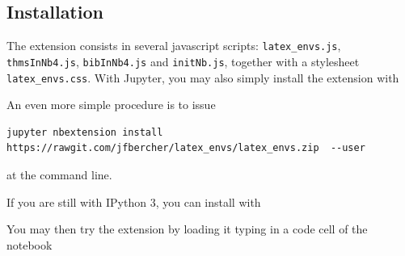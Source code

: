     \subsection{Installation}\label{installation}

    The extension consists in several javascript scripts:
\texttt{latex\_envs.js}, \texttt{thmsInNb4.js}, \texttt{bibInNb4.js} and
\texttt{initNb.js}, together with a stylesheet \texttt{latex\_envs.css}.
With Jupyter, you may also simply install the extension with

\begin{Shaded}
\begin{Highlighting}[]
  
\NormalTok{)}
\end{Highlighting}
\end{Shaded}

    An even more simple procedure is to issue

\begin{verbatim}
jupyter nbextension install https://rawgit.com/jfbercher/latex_envs/latex_envs.zip  --user
\end{verbatim}

at the command line.

    If you are still with IPython 3, you can install with

\begin{Shaded}
\begin{Highlighting}[]
  
\NormalTok{)}
\end{Highlighting}
\end{Shaded}

    You may then try the extension by loading it typing in a code cell of
the notebook

\begin{Shaded}
\end{Shaded}

